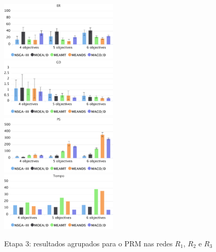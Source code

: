 \begin{figure}[!htbp]
	\caption{Etapa 3: resultados agrupados para o PRM nas redes $R_1$, $R_2$ e $R_3$}
	\label{fig_exp3_prm_todos}
	\includegraphics[width=0.5\textwidth]{cap_experimentos/figs/etapa3/er-mrp-todos}
	\includegraphics[width=0.5\textwidth]{cap_experimentos/figs/etapa3/gd-mrp-todos}
	\includegraphics[width=0.5\textwidth]{cap_experimentos/figs/etapa3/ps-mrp-todos}
	\includegraphics[width=0.5\textwidth]{cap_experimentos/figs/etapa3/time-mrp-todos}
\end{figure}

